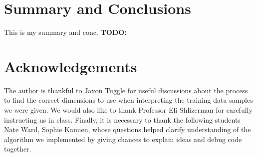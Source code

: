 \documentclass[11pt]{amsart}
\begin{document}
\section{Summary and Conclusions}\label{sec:conclusions}
This is my summary and conc. \textbf{TODO:}

\section*{Acknowledgements} 

The author is thankful to Jaxon Tuggle for useful discussions about the process to find the correct dimensions to use when interpreting the training data samples we were given.
We would also like to thank Professor Eli Shlizerman for carefully instructing us in class.
Finally, it is necessary to thank the following students Nate Ward, Sophie Kamien, whose questions helped clarify understanding of the algorithm we implemented by giving chances to explain ideas and debug code together.


\end{document}
